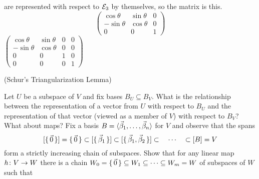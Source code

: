 \begin{exercises}
\begin{answer}
\begin{exparts}
\begin{equation*}
         \end{equation*}
         are represented with respect to ${\cal E}_3$
         by themselves, so the matrix is this.
         \begin{equation*}
            \begin{pmatrix}
              \cos\theta    &\sin\theta  &0   \\
              -\sin\theta   &\cos\theta  &0    \\
              0             &0           &1
            \end{pmatrix}                  
         \end{equation*}
        \partsitem 
            $\begin{pmatrix}
              \cos\theta  &\sin\theta &0 &0 \\
              -\sin\theta  &\cos\theta  &0 &0 \\
              0           &0           &1 &0 \\
              0           &0           &0 &1
            \end{pmatrix}$
      \end{exparts}   
    \end{answer}
  \item (Schur's Triangularization Lemma)%
    \begin{exparts}
      \partsitem Let \( U \) be a subspace of \( V \) and fix bases
        \( B_U\subseteq B_V \).
        What is the relationship between the representation of a vector
        from \( U \) with
        respect to \( B_U \) and the representation of that vector
        (viewed as a member of \( V \)) with
        respect to \( B_V \)?
      \partsitem What about maps?
      \partsitem Fix a basis 
        \( B=\langle\vec{\beta}_1,\dots,\vec{\beta}_n\rangle \)
        for \( V \) and observe that the spans
        \begin{equation*}
          \relax [\mbox{$\{\,\vec{0}\,\}$}\relax ]=\mbox{$\{\,\vec{0}\,\}$}\subset\relax [\mbox{$\{\,\vec{\beta}_1\,\}$}\relax ]
                        \subset\relax [\mbox{$\{\,\vec{\beta}_1,\vec{\beta}_2\,\}$}\relax ]
               \subset \quad\cdots\quad 
               \subset\relax [B\relax ]=V
        \end{equation*}
        form a strictly increasing chain of subspaces.
        Show that for any linear map \( \mbox{$h\colon V\to W$} \) there is a chain
        \( W_0=\mbox{$\{\,\vec{0}\,\}$}\subseteq W_1\subseteq \dots \subseteq W_m =W \) of
        subspaces of \( W \) such that 
        \begin{equation*}

\end{equation*}
\end{exparts}
\end{exercises}

